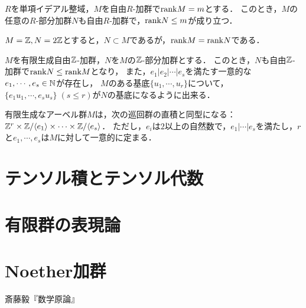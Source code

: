 \documentclass[uplatex,dvipdfmx]{jsreport}
\begin{document}
\begin{theorem}
    $R$を単項イデアル整域，$M$を自由$R$-加群で$\mathrm{rank} M=m$とする．
    このとき，$M$の任意の$R$-部分加群$N$も自由$R$-加群で，$\mathrm{rank} N\le m$が成り立つ．
\end{theorem}

\begin{example}[線形空間論との違い]
    $M=\mathbb{Z},N=2\mathbb{Z}$とすると，$N\subset M$であるが，$\mathrm{rank} M=\mathrm{rank} N$である．
\end{example}

\begin{theorem}
    $M$を有限生成自由$\mathbb{Z}$-加群，$N$を$M$の$\mathbb{Z}$-部分加群とする．
    このとき，$N$も自由$\mathbb{Z}$-加群で$\mathrm{rank} N\le\mathrm{rank} M$となり，
    また，$e_1|e_2|\cdots|e_s$を満たす一意的な$e_1,\cdots,e_s\in\mathbb{N}$が存在し，
    $M$のある基底$\{u_1,\cdots,u_r\}$について，$\{e_1u_1,\cdots,e_su_s\}\;(s\le r)$が$N$の基底になるように出来る．
\end{theorem}

\begin{corollary}
    有限生成なアーベル群$M$は，次の巡回群の直積と同型になる：$\mathbb{Z}^r\times\mathbb{Z}/\langle e_1\rangle\times\cdots\times\mathbb{Z}/\langle e_s\rangle$．
    ただし，$e_i$は$2$以上の自然数で，$e_1|\cdots|e_s$を満たし，$r$と$e_1,\cdots,e_s$は$M$に対して一意的に定まる．
\end{corollary}

\chapter{テンソル積とテンソル代数}

\chapter{有限群の表現論}

\chapter{Noether加群}

\begin{thebibliography}{9}
    斎藤毅『数学原論』
\end{thebibliography}
\end{document}

